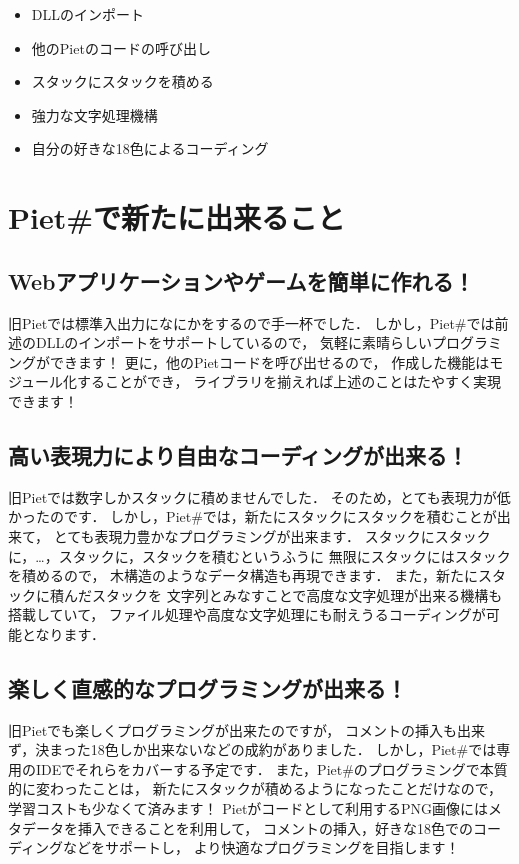 \begin{itemize}
\item
  DLLのインポート
\item
  他のPietのコードの呼び出し
\item
  スタックにスタックを積める
\item
  強力な文字処理機構
\item
  自分の好きな18色によるコーディング
\end{itemize}

\section{Piet\#で新たに出来ること}

\subsection{Webアプリケーションやゲームを簡単に作れる！}

旧Pietでは標準入出力になにかをするので手一杯でした．
しかし，Piet\#では前述のDLLのインポートをサポートしているので，
気軽に素晴らしいプログラミングができます！
更に，他のPietコードを呼び出せるので，
作成した機能はモジュール化することができ，
ライブラリを揃えれば上述のことはたやすく実現できます！

\subsection{高い表現力により自由なコーディングが出来る！}

旧Pietでは数字しかスタックに積めませんでした．
そのため，とても表現力が低かったのです．
しかし，Piet\#では，新たにスタックにスタックを積むことが出来て，
とても表現力豊かなプログラミングが出来ます．
スタックにスタックに，\ldots{}，スタックに，スタックを積むというふうに
無限にスタックにはスタックを積めるので，
木構造のようなデータ構造も再現できます．
また，新たにスタックに積んだスタックを
文字列とみなすことで高度な文字処理が出来る機構も搭載していて，
ファイル処理や高度な文字処理にも耐えうるコーディングが可能となります．

\subsection{楽しく直感的なプログラミングが出来る！}

旧Pietでも楽しくプログラミングが出来たのですが，
コメントの挿入も出来ず，決まった18色しか出来ないなどの成約がありました．
しかし，Piet\#では専用のIDEでそれらをカバーする予定です．
また，Piet\#のプログラミングで本質的に変わったことは，
新たにスタックが積めるようになったことだけなので，
学習コストも少なくて済みます！
Pietがコードとして利用するPNG画像にはメタデータを挿入できることを利用して，
コメントの挿入，好きな18色でのコーディングなどをサポートし，
より快適なプログラミングを目指します！

